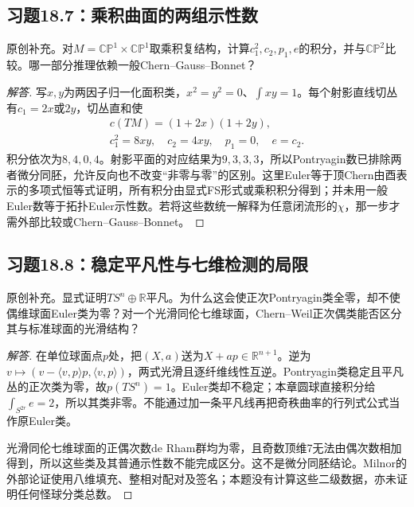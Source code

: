 \subsection*{习题18.7：乘积曲面的两组示性数}
原创补充。对$M=\mathbb{CP}^1\times\mathbb{CP}^1$取乘积复结构，计算$c_1^2,c_2,p_1,e$的积分，并与$\mathbb{CP}^2$比较。哪一部分推理依赖一般Chern--Gauss--Bonnet？
\begin{proof}[解答]
写$x,y$为两因子归一化面积类，$x^2=y^2=0$、$\int xy=1$。每个射影直线切丛有$c_1=2x$或$2y$，切丛直和使
\begin{gather*}
 c(TM)=(1+2x)(1+2y),\\
 c_1^2=8xy,\quad c_2=4xy,\quad p_1=0,\quad e=c_2.
\end{gather*}
积分依次为$8,4,0,4$。射影平面的对应结果为$9,3,3,3$，所以Pontryagin数已排除两者微分同胚，允许反向也不改变“非零与零”的区别。这里Euler等于顶Chern由酉表示的多项式恒等式证明，所有积分由显式FS形式或乘积积分得到；并未用一般Euler数等于拓扑Euler示性数。若将这些数统一解释为任意闭流形的$\chi$，那一步才需外部比较或Chern--Gauss--Bonnet。
\end{proof}

\subsection*{习题18.8：稳定平凡性与七维检测的局限}
原创补充。显式证明$TS^n\oplus\mathbb R$平凡。为什么这会使正次Pontryagin类全零，却不使偶维球面Euler类为零？对一个光滑同伦七维球面，Chern--Weil正次偶类能否区分其与标准球面的光滑结构？
\begin{proof}[解答]
在单位球面点$p$处，把$(X,a)$送为$X+ap\in\mathbb R^{n+1}$。逆为$v\mapsto(v-\langle v,p\rangle p,\langle v,p\rangle)$，两式光滑且逐纤维线性互逆。Pontryagin类稳定且平凡丛的正次类为零，故$p(TS^n)=1$。Euler类却不稳定；本章圆球直接积分给$\int_{S^{2r}}e=2$，所以其类非零。不能通过加一条平凡线再把奇秩曲率的行列式公式当作原Euler类。

光滑同伦七维球面的正偶次数de Rham群均为零，且奇数顶维7无法由偶次数相加得到，所以这些类及其普通示性数不能完成区分。这不是微分同胚结论。Milnor的外部论证使用八维填充、整相对配对及签名；本题没有计算这些二级数据，亦未证明任何怪球分类总数。
\end{proof}
